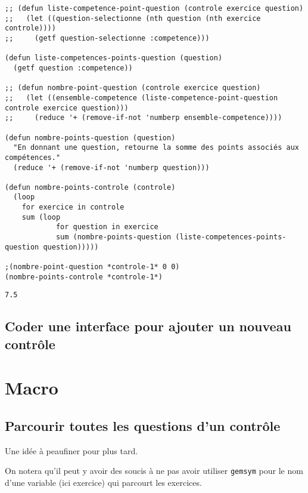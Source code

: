 \documentclass[a4paper, 11pt, DIV=18]{scrartcl}
\begin{document}
\begin{verbatim}
;; (defun liste-competence-point-question (controle exercice question)
;;   (let ((question-selectionne (nth question (nth exercice controle))))
;;     (getf question-selectionne :competence)))

(defun liste-competences-points-question (question)
  (getf question :competence))

;; (defun nombre-point-question (controle exercice question)
;;   (let ((ensemble-competence (liste-competence-point-question controle exercice question)))
;;     (reduce '+ (remove-if-not 'numberp ensemble-competence))))

(defun nombre-points-question (question)
  "En donnant une question, retourne la somme des points associés aux compétences."
  (reduce '+ (remove-if-not 'numberp question)))

(defun nombre-points-controle (controle)
  (loop
    for exercice in controle
    sum (loop
            for question in exercice
            sum (nombre-points-question (liste-competences-points-question question)))))

;(nombre-point-question *controle-1* 0 0)
(nombre-points-controle *controle-1*)
\end{verbatim}

\begin{verbatim}
7.5
\end{verbatim}

\subsection{Coder une interface pour ajouter un nouveau contrôle}
\label{sec:org95f931e}


\section{Macro}
\label{sec:orgadf8a02}

\subsection{Parcourir toutes les questions d'un contrôle}
\label{sec:org0790ae5}

Une idée à peaufiner pour plus tard.

On notera qu'il peut y avoir des soucis à ne pas avoir utiliser \texttt{gemsym} pour le
nom d'une variable (ici exercice) qui parcourt les exercices.
\end{document}
